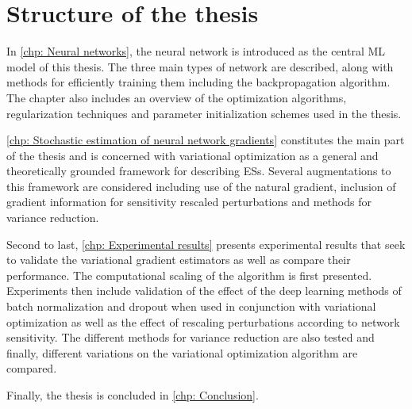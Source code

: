 
\section{Structure of the thesis}
In \autoref{chp: Neural networks}, the neural network is introduced as the central \gls{ML} model of this thesis. The three main types of network are described, along with methods for efficiently training them including the backpropagation algorithm. The chapter also includes an overview of the optimization algorithms, regularization techniques and parameter initialization schemes used in the thesis.

\autoref{chp: Stochastic estimation of neural network gradients} constitutes the main part of the thesis and is concerned with variational optimization as a general and theoretically grounded framework for describing \glspl{ES}. Several augmentations to this framework are considered including use of the natural gradient, inclusion of gradient information for sensitivity rescaled perturbations and methods for variance reduction.

Second to last, \autoref{chp: Experimental results} presents experimental results that seek to validate the variational gradient estimators as well as compare their performance. The computational scaling of the algorithm is first presented. Experiments then include validation of the effect of the deep learning methods of batch normalization and dropout when used in conjunction with variational optimization as well as the effect of rescaling perturbations according to network sensitivity. The different methods for variance reduction are also tested and finally, different variations on the variational optimization algorithm are compared.

Finally, the thesis is concluded in \autoref{chp: Conclusion}.
